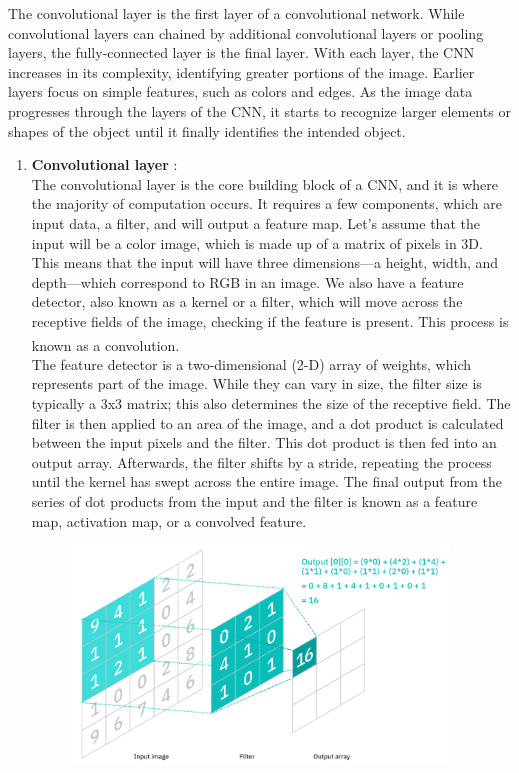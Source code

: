 The convolutional layer is the first layer of a convolutional network. While convolutional layers can chained by additional convolutional layers or pooling layers, the fully-connected layer is the final layer. With each layer, the CNN increases in its complexity, identifying greater portions of the image. Earlier layers focus on simple features, such as colors and edges. As the image data progresses through the layers of the CNN, it starts to recognize larger elements or shapes of the object until it finally identifies the intended object. 
    
\begin{enumerate}
    \item \textbf{Convolutional layer} : \\
        The convolutional layer is the core building block of a CNN, and it is where the majority of computation occurs. It requires a few components, which are input data, a filter, and will output a feature map. Let’s assume that the input will be a color image, which is made up of a matrix of pixels in 3D. This means that the input will have three dimensions—a height, width, and depth—which correspond to RGB in an image. We also have a feature detector, also known as a kernel or a filter, which will move across the receptive fields of the image, checking if the feature is present. This process is known as a convolution. \textsuperscript{\cite{CNN-IBM}} \\
        The feature detector is a two-dimensional (2-D) array of weights, which represents part of the image. While they can vary in size, the filter size is typically a 3x3 matrix; this also determines the size of the receptive field. The filter is then applied to an area of the image, and a dot product is calculated between the input pixels and the filter. This dot product is then fed into an output array. Afterwards, the filter shifts by a stride, repeating the process until the kernel has swept across the entire image. The final output from the series of dot products from the input and the filter is known as a feature map, activation map, or a convolved feature.
        \begin{figure}[H]
            \centering
            \includegraphics[width=10cm]{../images/CNN-kernel.png}

\end{figure}
\end{enumerate}
